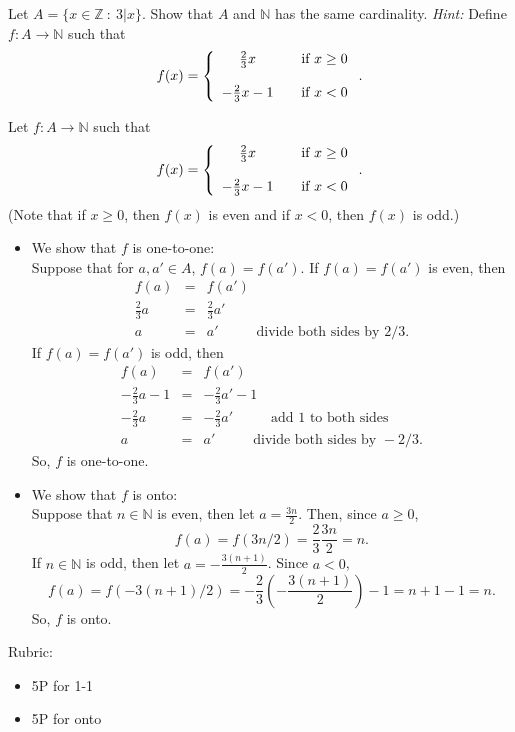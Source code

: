 \documentclass{article}
\newcommand{\Z}{\mathbb{Z}}
\newcommand{\N}{\mathbb{N}}
\theoremstyle{definition}
\begin{document}
\begin{question}
    Let $A = \{ x \in \Z ~:~ 3|x \}$.  Show that $A$ and $\mathbb{N}$ has the same cardinality.  {\it Hint:} Define $f: A \rightarrow \N$ such that
\[ f(x) =\left\{\begin{array}{c c l} \frac{2}{3}x & & \text{if } x \geq 0 \\ ~ \\ -\frac{2}{3}x - 1 &  & \text{if } x < 0 \end{array} \right. .\]
\end{question}
\begin{solution}
Let $f: A \rightarrow \N$ such that 
\[ f(x) =\left\{\begin{array}{c c l} \frac{2}{3}x & & \text{if } x \geq 0 \\ ~ \\ -\frac{2}{3}x - 1 &  & \text{if } x < 0 \end{array} \right. .\]
(Note that if $x \geq 0$, then $f(x)$ is even and if $x < 0$, then $f(x)$ is odd.)

\begin{itemize}
\item We show that $f$ is one-to-one:\\
Suppose that for $a, a' \in A$, $f(a) = f(a')$.  If $f(a) = f(a')$ is even, then
\begin{eqnarray*}
f(a) & = & f(a') \\
\frac{2}{3} a & = & \frac{2}{3} a' \\
a & = & a' \hspace{1cm} \text{ divide both sides by } 2/3.
\end{eqnarray*}
If $f(a) = f(a')$ is odd, then
\begin{eqnarray*}
f(a) & = & f(a') \\
-\frac{2}{3} a - 1 & = & -\frac{2}{3} a' - 1 \\
-\frac{2}{3} a & = & -\frac{2}{3} a'\hspace{1cm} \text{ add 1 to both sides }\\
a & = & a' \hspace{1cm} \text{ divide both sides by } -2/3.
\end{eqnarray*}
So, $f$ is one-to-one.
\item We show that $f$ is onto:\\
Suppose that $n \in \N$ is even, then let $a = \frac{3n}{2}$.  Then, since $a \geq 0$, 
\[ f(a) = f(3n/2) = \frac{2}{3} \frac{3n}{2} = n. \]
If $n \in \N$ is odd, then let $a = -\frac{3(n+1)}{2}$.  Since $a < 0$,
\[ f(a) = f(-3(n+1)/2) = -\frac{2}{3}\left(-\frac{3(n+1)}{2}\right) - 1 =  n+1 - 1 = n.\]
So, $f$ is onto.

\end{itemize}
{\color{red} Rubric:
\begin{itemize}
\item 5P for 1-1
\item 5P for onto
\end{itemize}}
\end{solution}
\end{document}
